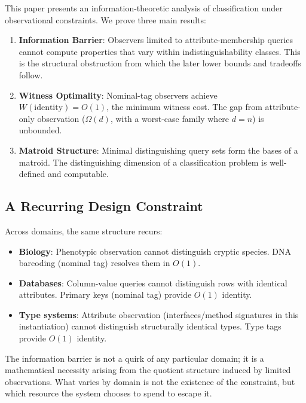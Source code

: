 This paper presents an information-theoretic analysis of classification under observational constraints. We prove three main results:

\begin{enumerate}
\item \textbf{Information Barrier}: Observers limited to attribute-membership queries cannot compute properties that vary within indistinguishability classes. This is the structural obstruction from which the later lower bounds and tradeoffs follow.

\item \textbf{Witness Optimality}: Nominal-tag observers achieve $W(\text{identity}) = O(1)$, the minimum witness cost. The gap from attribute-only observation ($\Omega(d)$, with a worst-case family where $d = n$) is unbounded.

\item \textbf{Matroid Structure}: Minimal distinguishing query sets form the bases of a matroid. The distinguishing dimension of a classification problem is well-defined and computable.
\end{enumerate}

\subsection{A Recurring Design Constraint}

Across domains, the same structure recurs:

\begin{itemize}
\item \textbf{Biology}: Phenotypic observation cannot distinguish cryptic species. DNA barcoding (nominal tag) resolves them in $O(1)$.

\item \textbf{Databases}: Column-value queries cannot distinguish rows with identical attributes. Primary keys (nominal tag) provide $O(1)$ identity.

\item \textbf{Type systems}: Attribute observation (interfaces/method signatures in this instantiation) cannot distinguish structurally identical types. Type tags provide $O(1)$ identity.
\end{itemize}

The information barrier is not a quirk of any particular domain; it is a mathematical necessity arising from the quotient structure induced by limited observations. What varies by domain is not the existence of the constraint, but which resource the system chooses to spend to escape it.


